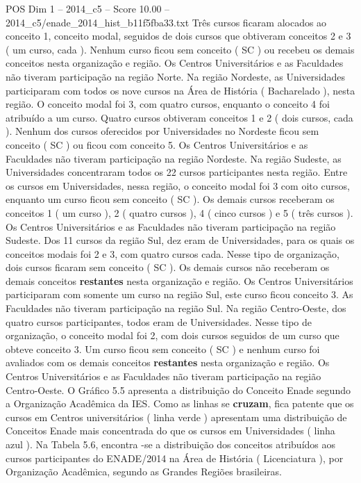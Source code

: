 \begin{textsample}{POS Dim 1 – 2014\_c5 – Score 10.00 – 2014\_c5/enade\_2014\_hist\_b11f5fba33.txt}
Três cursos ficaram alocados ao conceito 1, conceito modal, seguidos de dois cursos que obtiveram conceitos 2 e 3 ( um curso, cada ).
Nenhum curso ficou sem conceito ( SC ) ou recebeu os demais conceitos nesta organização e região.
Os Centros Universitários e as Faculdades não tiveram participação na região Norte.
Na região Nordeste, as Universidades participaram com todos os nove cursos na Área de História ( Bacharelado ), nesta região.
O conceito modal foi 3, com quatro cursos, enquanto o conceito 4 foi atribuído a um curso.
Quatro cursos obtiveram conceitos 1 e 2 ( dois cursos, cada ).
Nenhum dos cursos oferecidos por Universidades no Nordeste ficou sem conceito ( SC ) ou ficou com conceito 5.
Os Centros Universitários e as Faculdades não tiveram participação na região Nordeste.
Na região Sudeste, as Universidades concentraram todos os 22 cursos participantes nesta região.
Entre os cursos em Universidades, nessa região, o conceito modal foi 3 com oito cursos, enquanto um curso ficou sem conceito ( SC ).
Os demais cursos receberam os conceitos 1 ( um curso ), 2 ( quatro cursos ), 4 ( cinco cursos ) e 5 ( três cursos ).
Os Centros Universitários e as Faculdades não tiveram participação na região Sudeste.
Dos 11 cursos da região Sul, dez eram de Universidades, para os quais os conceitos modais foi 2 e 3, com quatro cursos cada.
Nesse tipo de organização, dois cursos ficaram sem conceito ( SC ).
Os demais cursos não receberam os demais conceitos \textbf{restantes} nesta organização e região.
Os Centros Universitários participaram com somente um curso na região Sul, este curso ficou conceito 3.
As Faculdades não tiveram participação na região Sul.
Na região Centro-Oeste, dos quatro cursos participantes, todos eram de Universidades.
Nesse tipo de organização, o conceito modal foi 2, com dois cursos seguidos de um curso que obteve conceito 3.
Um curso ficou sem conceito ( SC ) e nenhum curso foi avaliados com os demais conceitos \textbf{restantes} nesta organização e região.
Os Centros Universitários e as Faculdades não tiveram participação na região Centro-Oeste.
O Gráfico 5.5 apresenta a distribuição do Conceito Enade segundo a Organização Acadêmica da IES.
Como as linhas se \textbf{cruzam}, fica patente que os cursos em Centros universitários ( linha verde ) apresentam uma distribuição de Conceitos Enade mais concentrada do que os cursos em Universidades ( linha azul ).
Na Tabela 5.6, encontra -se a distribuição dos conceitos atribuídos aos cursos participantes do ENADE/2014 na Área de História ( Licenciatura ), por Organização Acadêmica, segundo as Grandes Regiões brasileiras.

\end{textsample}
